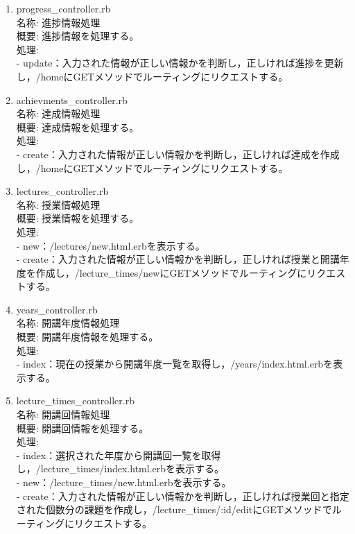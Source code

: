 \begin{enumerate}
\item progress\_controller.rb\\
名称:
進捗情報処理\\
概要:
進捗情報を処理する。\\
処理:\\
- update：入力された情報が正しい情報かを判断し，正しければ進捗を更新し，/homeにGETメソッドでルーティングにリクエストする。

\item achievments\_controller.rb\\
名称:
達成情報処理\\
概要:
達成情報を処理する。\\
処理:\\
- create：入力された情報が正しい情報かを判断し，正しければ達成を作成し，/homeにGETメソッドでルーティングにリクエストする。

\item lectures\_controller.rb\\
名称:
授業情報処理\\
概要:
授業情報を処理する。\\
処理:\\
- new：/lectures/new.html.erbを表示する。\\
- create：入力された情報が正しい情報かを判断し，正しければ授業と開講年度を作成し，/lecture\_times/newにGETメソッドでルーティングにリクエストする。

\item years\_controller.rb\\
名称:
開講年度情報処理\\
概要:
開講年度情報を処理する。\\
処理:\\
- index：現在の授業から開講年度一覧を取得し，/years/index.html.erbを表示する。

\item lecture\_times\_controller.rb\\
名称:
開講回情報処理\\
概要:
開講回情報を処理する。\\
処理:\\
- index：選択された年度から開講回一覧を取得し，/lecture\_times/index.html.erbを表示する。\\
- new：/lecture\_times/new.html.erbを表示する。\\
- create：入力された情報が正しい情報かを判断し，正しければ授業回と指定された個数分の課題を作成し，/lecture\_times/:id/editにGETメソッドでルーティングにリクエストする。


\end{enumerate}
